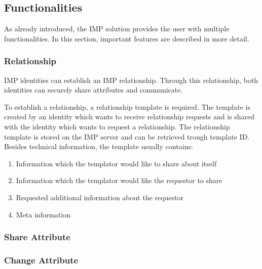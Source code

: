 \subsection{Functionalities}
As already introduced, the IMP solution provides the user with multiple functionalities. In this section, important features are described in more detail.

\subsubsection{Relationship}

IMP identities can establish an IMP relationship. Through this relationship, both identities can securely share attributes and communicate.

To establish a relationship, a relationship template is required. The template is created by an identity which wants to receive relationship requests and is shared with the identity which wants to request a relationship. The relationship template is stored on the IMP server and can be retrieved trough template ID. Besides technical information, the template usually contains:
\begin{enumerate}
    \item Information which the templator would like to share about itself 
    \item Information which the templator would like the requestor to share
    \item Requested additional information about the requestor 
    \item Meta information 
\end{enumerate}

\subsubsection{Share Attribute}

\subsubsection{Change Attribute}


